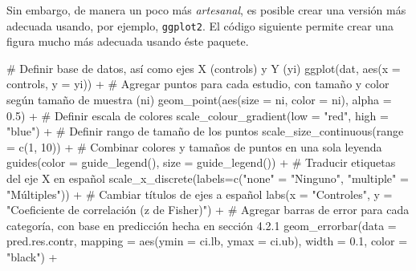 \documentclass[
  bookmarksnumbered]{article}
\newenvironment{Shaded}{\begin{snugshade}}{\end{snugshade}}
\newcommand{\AttributeTok}[1]{\textcolor[rgb]{0.00,0.34,0.68}{#1}}
\newcommand{\CommentTok}[1]{\textcolor[rgb]{0.54,0.53,0.53}{#1}}
\newcommand{\DecValTok}[1]{\textcolor[rgb]{0.69,0.50,0.00}{#1}}
\newcommand{\FloatTok}[1]{\textcolor[rgb]{0.69,0.50,0.00}{#1}}
\newcommand{\FunctionTok}[1]{\textcolor[rgb]{0.39,0.29,0.61}{#1}}
\newcommand{\NormalTok}[1]{\textcolor[rgb]{0.12,0.11,0.11}{#1}}
\newcommand{\OtherTok}[1]{\textcolor[rgb]{0.00,0.43,0.16}{#1}}
\newcommand{\SpecialCharTok}[1]{\textcolor[rgb]{0.24,0.68,0.91}{#1}}
\newcommand{\StringTok}[1]{\textcolor[rgb]{0.75,0.01,0.01}{#1}}
\begin{document}
Sin embargo, de manera un poco más \emph{artesanal}, es posible crear una versión más adecuada usando, por ejemplo, \texttt{ggplot2}. El código siguiente permite crear una figura mucho más adecuada usando éste paquete.

\begin{Shaded}
\begin{Highlighting}[]
\CommentTok{\# Definir base de datos, así como ejes X (controls) y Y (yi)}
\FunctionTok{ggplot}\NormalTok{(dat, }\FunctionTok{aes}\NormalTok{(}\AttributeTok{x =}\NormalTok{ controls, }\AttributeTok{y =}\NormalTok{ yi)) }\SpecialCharTok{+}
  \CommentTok{\# Agregar puntos para cada estudio, con tamaño y color según tamaño de muestra (ni)}
  \FunctionTok{geom\_point}\NormalTok{(}\FunctionTok{aes}\NormalTok{(}\AttributeTok{size =}\NormalTok{ ni, }\AttributeTok{color =}\NormalTok{ ni), }\AttributeTok{alpha =} \FloatTok{0.5}\NormalTok{) }\SpecialCharTok{+}
  \CommentTok{\# Definir escala de colores}
  \FunctionTok{scale\_colour\_gradient}\NormalTok{(}\AttributeTok{low =} \StringTok{"red"}\NormalTok{, }\AttributeTok{high =} \StringTok{"blue"}\NormalTok{) }\SpecialCharTok{+}
  \CommentTok{\# Definir rango de tamaño de los puntos}
  \FunctionTok{scale\_size\_continuous}\NormalTok{(}\AttributeTok{range =} \FunctionTok{c}\NormalTok{(}\DecValTok{1}\NormalTok{, }\DecValTok{10}\NormalTok{)) }\SpecialCharTok{+}
  \CommentTok{\# Combinar colores y tamaños de puntos en una sola leyenda}
  \FunctionTok{guides}\NormalTok{(}\AttributeTok{color =} \FunctionTok{guide\_legend}\NormalTok{(), }\AttributeTok{size =} \FunctionTok{guide\_legend}\NormalTok{()) }\SpecialCharTok{+}
  \CommentTok{\# Traducir etiquetas del eje X en español}
  \FunctionTok{scale\_x\_discrete}\NormalTok{(}\AttributeTok{labels=}\FunctionTok{c}\NormalTok{(}\StringTok{"none"} \OtherTok{=} \StringTok{"Ninguno"}\NormalTok{, }\StringTok{"multiple"} \OtherTok{=} \StringTok{"Múltiples"}\NormalTok{)) }\SpecialCharTok{+}
  \CommentTok{\# Cambiar títulos de ejes a español}
  \FunctionTok{labs}\NormalTok{(}\AttributeTok{x =} \StringTok{"Controles"}\NormalTok{, }\AttributeTok{y =} \StringTok{"Coeficiente de correlación (z de Fisher)"}\NormalTok{) }\SpecialCharTok{+}
  \CommentTok{\# Agregar barras de error para cada categoría, con base en predicción hecha en sección 4.2.1}
  \FunctionTok{geom\_errorbar}\NormalTok{(}\AttributeTok{data =}\NormalTok{ pred.res.contr, }\AttributeTok{mapping =} \FunctionTok{aes}\NormalTok{(}\AttributeTok{ymin =}\NormalTok{ ci.lb, }\AttributeTok{ymax =}\NormalTok{ ci.ub),}
                \AttributeTok{width =} \FloatTok{0.1}\NormalTok{, }\AttributeTok{color =} \StringTok{"black"}\NormalTok{) }\SpecialCharTok{+}

\end{Highlighting}
\end{Shaded}
\end{document}
